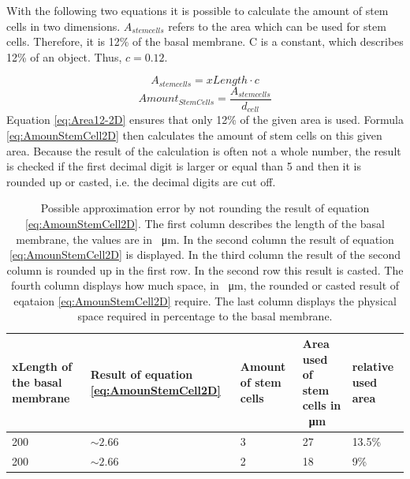 With the following two equations it is possible to calculate the amount of stem cells in two dimensions. $A_{stem cells}$ refers to the area which can be used for stem cells. Therefore, it is 12\% of the basal membrane. C is a constant, which describes 12\% of an object. Thus, $c=0.12$.

\begin{equation}\label{eq:Area12-2D}
A_{stem cells} = xLength \cdot c
\end{equation}
\begin{equation}\label{eq:AmounStemCell2D}
Amount_{StemCells} = \dfrac{A_{stem cells}}{d_{cell}} 
\end{equation}
Equation \ref{eq:Area12-2D} ensures that only 12\% of the given area is used. Formula \ref{eq:AmounStemCell2D} then calculates the amount of stem cells on this given area. Because the result of the calculation is often not a whole number, the result is checked if the first decimal digit is larger or equal than 5 and then it is rounded up or casted, i.e. the decimal digits are cut off.

\begin{table}
\centering
\caption{Possible approximation error by not rounding the result of equation \ref{eq:AmounStemCell2D}. The first column describes the length of the basal membrane, the values are  in \SI{}{\micro\metre}. In the second column the result of equation \ref{eq:AmounStemCell2D} is displayed. In the third column the result of the second column is rounded up in the first row. In the second row this result is casted. The fourth column displays how much space, in \SI{}{\micro\metre}, the rounded or casted result of eqataion \ref{eq:AmounStemCell2D} require. The last column displays the physical space required in percentage to the basal membrane.}
\renewcommand{\arraystretch}{1.5}
	\begin{tabularx}{\textwidth}{X||X||X||X||X}
		xLength of the basal membrane & Result of equation \ref{eq:AmounStemCell2D} & Amount of stem cells & Area used of stem cells  in \SI{}{\micro\metre} & relative used area  \\
		\hline
		200 & $\sim 2.66$ & 3 & 27 & 13.5\% \\
		
		200 & $\sim 2.66$ & 2 & 18 & 9\% 

	\end{tabularx}
	\label{tbl:Approximation error}
\end{table}

